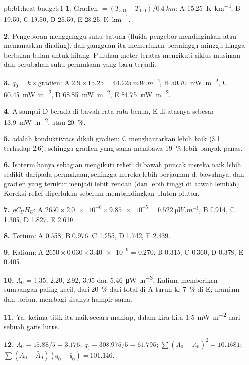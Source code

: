 \begin{solution}{pb:b1:heat-budget:1}
\textbf{1.} Gradien $= (T_{500} - T_{100})/\qty{0.4}{km}$: A \qty{15.25}{K.km^{-1}},
B \num{19.50}, C \num{19.50}, D \num{25.50}, E \qty{28.25}{K.km^{-1}}.

\textbf{2.} Pengeboran mengganggu suhu batuan (fluida pengebor mendinginkan atau memanaskan dinding), dan gangguan itu memerlukan berminggu-minggu hingga berbulan-bulan untuk hilang. Puluhan meter teratas mengikuti siklus musiman dan perubahan suhu permukaan yang baru terjadi.

\textbf{3.} $q_0 = k\times$gradien: A $2.9\times15.25 = \qty{44.225}{mW.m^{-2}}$,
B \qty{50.70}{mW.m^{-2}}, C \qty{60.45}{mW.m^{-2}}, D \qty{68.85}{mW.m^{-2}},
E \qty{84.75}{mW.m^{-2}}.

\textbf{4.} A sampai D berada di bawah rata-rata benua, E di atasnya sebesar
\qty{13.9}{mW.m^{-2}}, atau \qty{20}{\percent}.

\textbf{5.}  adalah konduktivitas dikali gradien: C menghantarkan lebih baik (3.1
terhadap 2.6), sehingga gradien yang sama membawa \qty{19}{\percent} lebih banyak panas.

\textbf{6.} Isoterm hanya sebagian mengikuti relief: di bawah puncak mereka naik lebih sedikit daripada permukaan, sehingga mereka lebih berjauhan di bawahnya, dan gradien yang terukur menjadi lebih rendah (dan lebih tinggi di bawah lembah). Koreksi relief diperlukan sebelum membandingkan pluton-pluton.

\textbf{7.} $\rho C_U H_U$: A $2650\times\num{2.0e-6}\times\num{9.85e-5} =
\qty{0.522}{\micro W.m^{-3}}$, B 0.914, C 1.305, D 1.827, E 2.610.

\textbf{8.} Torium: A 0.558, B 0.976, C 1.255, D 1.742, E 2.439.

\textbf{9.} Kalium: A $2650\times0.030\times\num{3.40e-9} = 0.270$, B 0.315,
C 0.360, D 0.378, E 0.405.

\textbf{10.} $A_0$ = 1.35, 2.20, 2.92, 3.95 dan \qty{5.46}{\micro W.m^{-3}}.
Kalium memberikan sumbangan paling kecil, dari \qty{20}{\percent} dari total di A turun ke
\qty{7}{\percent} di E; uranium dan torium membagi sisanya hampir sama.

\textbf{11.} Ya: kelima titik itu naik secara mantap, dalam kira-kira
\qty{1.5}{mW.m^{-2}} dari sebuah garis lurus.

\textbf{12.} $\bar A_0 = 15.88/5 = 3.176$, $\bar q_0 = 308.975/5 = 61.795$;
$\sum(A_0 - \bar A_0)^2 = 10.1681$; $\sum(A_0 - \bar A_0)(q_0 - \bar q_0) =
101.146$.


\end{solution}

